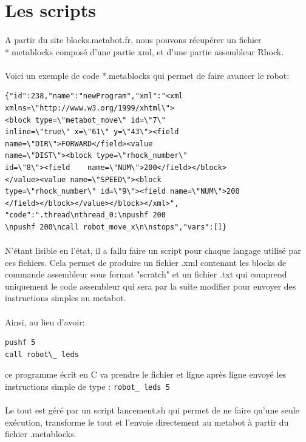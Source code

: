 \documentclass[10pt,a4paper]{report}
\begin{document}
\section{Les scripts}
\paragraph{}
A partir du site blocks.metabot.fr, nous pouvons récupérer un fichier *.metablocks composé d'une partie xml, et d'une partie assembleur Rhock.
\paragraph{}
Voici un exemple de code *.metablocks qui permet de faire avancer le robot:
\begin{verbatim}
{"id":238,"name":"newProgram","xml":"<xml
xmlns=\"http://www.w3.org/1999/xhtml\">
<block type=\"metabot_move\" id=\"7\"
inline=\"true\" x=\"61\" y=\"43\"><field
name=\"DIR\">FORWARD</field><value
name=\"DIST\"><block type=\"rhock_number\"
id=\"8\"><field    name=\"NUM\">200</field></block>
</value><value name=\"SPEED\"><block 
type=\"rhock_number\" id=\"9\"><field name=\"NUM\">200
</field></block></value></block></xml>",
"code":".thread\nthread_0:\npushf 200
\npushf 200\ncall robot_move_x\n\nstops","vars":[]}
\end{verbatim}
\paragraph{}
N'étant lisible en l'état, il a fallu faire un script pour chaque langage utilisé par ces fichiers. Cela permet de produire un fichier .xml contenant les blocks de commande assembleur sous format "scratch" et un fichier .txt qui comprend uniquement le code assembleur qui sera par la suite modifier pour envoyer des instructions simples au metabot.

\paragraph{}

Ainsi, au lieu d'avoir:
\begin{verbatim} 
pushf 5 
call robot\_ leds
\end{verbatim} 
ce programme écrit en C va prendre le fichier et ligne après ligne envoyé les instructions simple de type : 
\texttt{robot\_ leds 5}
\paragraph{}
Le tout est géré par un script lancement.sh qui permet de ne faire qu'une seule exécution, transforme le tout et l'envoie directement au metabot à partir du fichier .metablocks.
\end{document}

